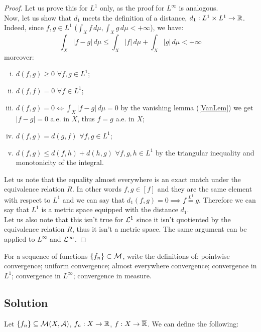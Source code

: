 \begin{proof}
    Let us prove this for $L^1$ only, as the proof for $L^\infty$ is analogous. \\
    Now, let us show that $d_1$ meets the definition of a distance, $d_1: L^1\times L^1 \to \mathbb{R}$. Indeed, since $f,g\in L^1$ ($\int_X f \, d\mu, \int_X g \, d\mu < + \infty$), we have:
    \[
        \int_X |f-g| \, d\mu \leq \int_X |f| \, d\mu + \int_X |g| \, d\mu < + \infty
    \]
    moreover:
    \begin{enumerate}[i)]
        \item $d(f,g)\geq 0 $ $\forall f,g \in L^1$;
        \item $d(f,f)=0$ $\forall f \in L^1$;
        \item $d(f,g)=0 \iff \int_X |f-g| \, d\mu =0$ by the vanishing lemma (\ref*{VanLem}) we get $|f-g|=0$ a.e. in $X$, thus $f=g$ a.e. in $X$;
        \item $d(f,g)=d(g,f)$ $\forall f,g \in L^1$;
        \item $d(f,g)\leq d(f,h)+d(h,g)$ $\forall f,g,h \in L^1$ by the triangular inequality and monotonicity of the integral.
    \end{enumerate}
    Let us note that the equality almost everywhere is an exact match under the equivalence relation $R$. In other words $f,g \in [f]$ and they are the same element with respect to $L^1$ and we can say that $d_1(f,g)=0\implies f \overset{L^1}{=}g$. Therefore we can say that $L^1$ is a metric space equipped with the distance $d_1$.\\
    Let us also note that this isn't true for $\mathcal{L}^1$ since it isn't quotiented by the equivalence relation $R$, thus it isn't a metric space. The same argument can be applied to $L^\infty$ and $\mathcal{L}^\infty$.
\end{proof}


\question
For a sequence of functions $\{ f_n \} \subset \mathcal{M}$, write the definitions of: pointwise convergence; uniform convergence; almost everywhere convergence; convergence in $L^1$; convergence in $L^\infty$; convergence in measure.

\subsection*{Solution}

Let $\{ f_n \}\subseteq \mathcal{M}(X,\mathcal{A})$, $f_n:X\to\mathbb{R}$, $f:X\to\overline{\mathbb{R}}$. We can define the following:

